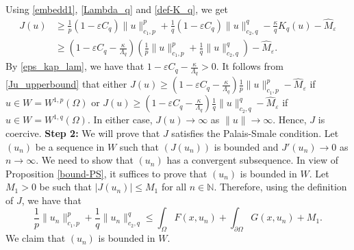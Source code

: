 \documentclass[pdflatex,sn-mathphys-num]{sn-jnl}
\theoremstyle{thmstyleone}%
\theoremstyle{thmstyletwo}%
\theoremstyle{thmstylethree}%
\theoremstyle{thmstylethree}%
\begin{document}
Using \eqref{embedd1}, \eqref{Lambda_q} and \eqref{def-K_q}, we get
\begin{equation}\label{Ju_upperbound}
    \begin{aligned}
        J(u)         &  \geqslant \frac{1}{p}(1-\varepsilon C_q)\|u\|_{c_1,p}^p+\frac{1}{q}(1-\varepsilon C_q)\|u\|_{c_2,q}^q- \frac{\kappa}q K_q(u)  - \hat{M}_\varepsilon\\     
        & \geqslant \left(1-\varepsilon C_q-\frac{\kappa}{ \Lambda_q}\right)\left(\frac{1}{p}\|u\|_{c_1,p}^p+\frac{1}{q}\|u\|_{c_2,q}^q\right) - \hat{M}_\varepsilon.
    \end{aligned}
\end{equation}
By \eqref{eps_kap_lam}, we have that  $1-\varepsilon C_q-\frac{\kappa}{ \Lambda_q}>0$. It follows from \eqref{Ju_upperbound} that either $J(u)\ge \left(1-\varepsilon C_q-\frac{\kappa}{ \Lambda_q}\right)\frac{1}{p}\|u\|_{c_1,p}^p - \hat{M}_\varepsilon$ if $u\in W=W^{1,p}(\Omega)$ or $J(u)\ge \left(1-\varepsilon C_q-\frac{\kappa}{ \Lambda_q}\right)\frac{1}{q}\|u\|_{c_2,q}^q  - \hat{M}_\varepsilon$ if $u\in W=W^{1,q}(\Omega)$. In either case, $J(u)\to \infty$ as $\|u\|\to \infty$. Hence,   $J$ is coercive.
\vskip0.2cm
\noindent
\textbf{Step 2:} We will prove that $J$ satisfies the Palais-Smale condition. Let $(u_n)$ be  a sequence  in $W$   such that $(J(u_n))$  is bounded and $ J' (u_n) \to 0$ as $n\to \infty$. We need to show that $(u_n)$ has a convergent subsequence.  In view of Proposition \ref{bound-PS}, it suffices to prove that $(u_n)$ is bounded in $W$. Let $M_1>0$ be such that $|J(u_n)|\leqslant M_1$  for all $n\in \mathbb{N}$. Therefore, using the definition of $J$, we have that 
\begin{equation}\label{J_bounded1}
     \frac{1}{p}\|u_n\|_{c_1, p}^p+\frac{1}{q}\|u_n\|_{c_2, q}^q\leqslant  \int_\Omega F(x,u_n) +\int_{\partial\Omega} G(x,u_n)  + M_1  .
 \end{equation}
We claim that $(u_n)$ is bounded in $W$.
\end{document}
